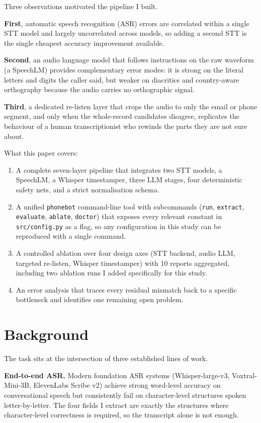 \documentclass[11pt,a4paper]{article}
\begin{document}
Three observations motivated the pipeline I built.

\textbf{First}, automatic speech recognition (ASR) errors are
correlated within a single STT model and largely uncorrelated across
models, so adding a second STT is the single cheapest accuracy
improvement available.

\textbf{Second}, an audio language model that follows instructions on
the raw waveform (a SpeechLM) provides complementary error modes: it
is strong on the literal letters and digits the caller said, but
weaker on diacritics and country-aware orthography because the audio
carries no orthographic signal.

\textbf{Third}, a dedicated re-listen layer that crops the audio to
only the email or phone segment, and only when the whole-record
candidates disagree, replicates the behaviour of a human
transcriptionist who rewinds the parts they are not sure about.

What this paper covers:
\begin{enumerate}
\item A complete seven-layer pipeline that integrates two STT
       models, a SpeechLM, a Whisper timestamper, three LLM stages,
       four deterministic safety nets, and a strict normalisation
       schema.
\item A unified \verb|phonebot| command-line tool with subcommands
       (\verb|run|, \verb|extract|, \verb|evaluate|, \verb|ablate|,
       \verb|doctor|) that exposes every relevant constant in
       \verb|src/config.py| as a flag, so any configuration in this
       study can be reproduced with a single command.
\item A controlled ablation over four design axes (STT backend,
       audio LLM, targeted re-listen, Whisper timestamper) with 10
       reports aggregated, including two ablation runs I added
       specifically for this study.
\item An error analysis that traces every residual mismatch back to
       a specific bottleneck and identifies one remaining open
       problem.
\end{enumerate}

\section{Background}

The task sits at the intersection of three established lines of work.

\textbf{End-to-end ASR.} Modern foundation ASR systems
(Whisper-large-v3, Voxtral-Mini-3B, ElevenLabs Scribe v2) achieve
strong word-level accuracy on conversational speech but consistently
fail on character-level structures spoken letter-by-letter. The four
fields I extract are exactly the structures where character-level
correctness is required, so the transcript alone is not enough.
\end{document}
